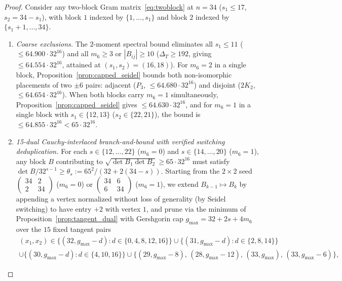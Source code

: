 \documentclass[11pt]{article}
\theoremstyle{remark}
\begin{document}
\begin{proof}
Consider any two-block Gram matrix~\eqref{eq:twoblock} at $n = 34$ ($s_1 \le 17$, $s_2 = 34 - s_1$), with block $1$ indexed by $\{1, \dots, s_1\}$ and block $2$ indexed by $\{s_1 + 1, \dots, 34\}$.
\begin{enumerate}[leftmargin=*,topsep=2pt,itemsep=1pt]
\item \emph{Coarse exclusions.} The $2$-moment spectral bound eliminates all $s_1 \le 11$ ($\le 64.900 \cdot 32^{16}$) and all $m_6 \ge 3$ or $|B_{ij}| \ge 10$ ($\Delta_T \ge 192$, giving $\le 64.554 \cdot 32^{16}$, attained at $(s_1, s_2) = (16, 18)$). For $m_6 = 2$ in a single block, Proposition~\ref{prop:capped_seidel} bounds both non-isomorphic placements of two $\pm 6$ pairs: adjacent ($P_3$, $\le 64.680 \cdot 32^{16}$) and disjoint ($2K_2$, $\le 64.654 \cdot 32^{16}$). When both blocks carry $m_6 = 1$ simultaneously, Proposition~\ref{prop:capped_seidel} gives $\le 64.630 \cdot 32^{16}$, and for $m_6 = 1$ in a single block with $s_1 \in \{12, 13\}$ ($s_2 \in \{22, 21\}$), the bound is $\le 64.855 \cdot 32^{16} < 65 \cdot 32^{16}$.
\item \emph{15-dual Cauchy-interlaced branch-and-bound with verified switching deduplication.} For each $s \in \{12, \dots, 22\}$ ($m_6 = 0$) and $s \in \{14, \dots, 20\}$ ($m_6 = 1$), any block $B$ contributing to $\sqrt{\det B_1 \det B_2} \ge 65 \cdot 32^{16}$ must satisfy $\det B / 32^{s-1} \ge \theta_s := 65^2 / (32 + 2(34 - s))$. Starting from the $2 \times 2$ seed $\begin{pmatrix} 34 & 2 \\ 2 & 34 \end{pmatrix}$ ($m_6 = 0$) or $\begin{pmatrix} 34 & 6 \\ 6 & 34 \end{pmatrix}$ ($m_6 = 1$), we extend $B_{k-1} \mapsto B_k$ by appending a vertex normalized without loss of generality (by Seidel switching) to have entry $+2$ with vertex $1$, and prune via the minimum of Proposition~\ref{prop:tangent_dual} with Gershgorin cap $g_{\max} = 32 + 2s + 4 m_6$ over the $15$ fixed tangent pairs
\begin{multline*}
  (x_1, x_2) \in \bigl\{(32, g_{\max} - d) : d \in \{0, 4, 8, 12, 16\}\bigr\}
  \cup \bigl\{(31, g_{\max} - d) : d \in \{2, 8, 14\}\bigr\} \\
  \cup \bigl\{(30, g_{\max} - d) : d \in \{4, 10, 16\}\bigr\}
  \cup \bigl\{(29, g_{\max} - 8),\, (28, g_{\max} - 12),\, (33, g_{\max}),\, (33, g_{\max} - 6)\bigr\},

\end{multline*}
\end{enumerate}
\end{proof}
\end{document}
